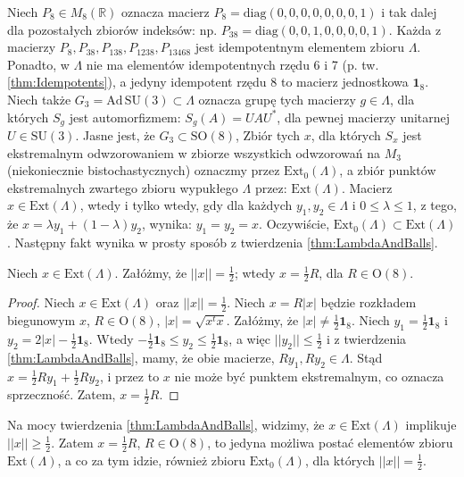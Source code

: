 {Niech $P_{8} \in M_{8}(\mathbb{R})$ oznacza macierz
$P_{8} = \text{diag}(0,0,0,0,0,0,0,1)$
i tak dalej dla pozostałych zbiorów indeksów: np.
$P_{38} = \text{diag}(0,0,1,0,0,0,0,1)$.
Każda z macierzy
$P_{8}, P_{38}, P_{138}, P_{1238}, P_{13468}$ jest idempotentnym elementem
zbioru $\Lambda$.
Ponadto, w $\Lambda$ nie ma elementów idempotentnych rzędu 6 i 7
(p. tw. \ref{thm:Idempotents}),
a jedyny idempotent rzędu 8 to macierz jednostkowa $\mathbf{1}_{8}$.
Niech także $G_{3} = \text{Ad} \, \text{SU}(3) \subset \Lambda$ oznacza
grupę tych macierzy $g \in \Lambda$, dla których
$S_{g}$ jest automorfizmem: $S_{g}(A) = U A U^{*}$,
dla pewnej macierzy unitarnej $U \in \text{SU}(3)$.
Jasne jest, że $G_{3} \subset \text{SO}(8)$,
Zbiór tych $x$, dla których $S_{x}$ jest ekstremalnym
odwzorowaniem w zbiorze wszystkich odwzorowań na $M_{3}$
(niekoniecznie bistochastycznych) oznaczmy przez
$\text{Ext}_{0}(\Lambda)$,
a zbiór punktów ekstremalnych zwartego zbioru wypukłego
$\Lambda$ przez: $\text{Ext}(\Lambda)$.
Macierz $x \in \text{Ext}(\Lambda)$,
wtedy i tylko wtedy, gdy dla każdych
$y_{1}, y_{2} \in \Lambda$ i $0 \leq \lambda \leq 1$,
z tego, że $x = \lambda y_{1} + (1-\lambda) y_{2}$,
wynika: $y_{1} = y_{2} = x$.
Oczywiście, $\text{Ext}_{0}(\Lambda) \subset \text{Ext}(\Lambda)$.
Następny fakt wynika w prosty sposób z twierdzenia
\ref{thm:LambdaAndBalls}.

\begin{Theorem}
    \label{thm:oneHalfofOrthogonal}
    Niech $x \in \mathrm{Ext}(\Lambda)$.
Załóżmy, że $||x|| = \frac{1}{2}$;
wtedy $ x = \frac{1}{2} R$, dla $R \in \mathrm{O}(8)$.
\end{Theorem}
\begin{proof}
Niech $x \in \mathrm{Ext}(\Lambda)$ oraz $||x|| = \frac{1}{2}$.
Niech $x = R |x|$ będzie rozkładem biegunowym $x$,
    $R \in \text{O}(8)$, $|x| = \sqrt{x^{t} x}$.
Załóżmy, że $|x| \neq \frac{1}{2} \mathbf{1}_{8}$.
Niech $y_{1} = \frac{1}{2} \mathbf{1}_{8}$ i
    $y_{2} = 2 |x| - \frac{1}{2} \mathbf{1}_{8}$.
Wtedy $- \frac{1}{2} \mathbf{1}_{8} \leq y_{2} \leq \frac{1}{2} \mathbf{1}_{8}$,
a więc $|| y_{2} || \leq \frac{1}{2}$
i z twierdzenia \ref{thm:LambdaAndBalls},
mamy, że obie macierze, $R y_{1}, R y_{2} \in \Lambda$.
Stąd $x = \frac{1}{2} R y_{1} + \frac{1}{2} R y_{2}$,
i przez to $x$ nie może być punktem ekstremalnym, co oznacza sprzeczność.
Zatem, $x = \frac{1}{2} R$.
\end{proof}

Na mocy twierdzenia \ref{thm:LambdaAndBalls},
widzimy, że $x \in \text{Ext}(\Lambda)$ implikuje
$||x|| \geq \frac{1}{2}$.
Zatem $x = \frac{1}{2} R$, $R \in \mathrm{O}(8)$,
to jedyna możliwa postać elementów zbioru $\text{Ext}(\Lambda)$,
a co za tym idzie, również zbioru $\text{Ext}_{0}(\Lambda)$,
dla których $||x|| = \frac{1}{2}$.

}
